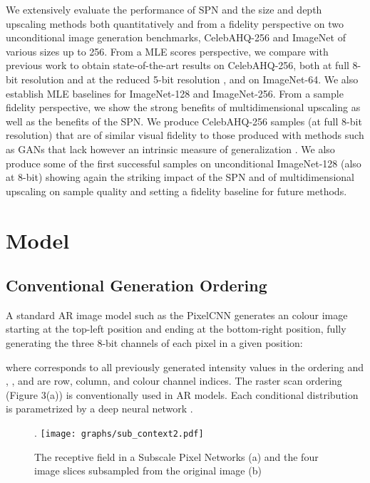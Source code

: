 \documentclass{article} \usepackage{iclr2019_conference,times}
\begin{document}
We extensively evaluate the performance of SPN and the size and depth upscaling methods both quantitatively and from a fidelity perspective on two unconditional image generation benchmarks, CelebAHQ-256 and ImageNet of various sizes up to 256. From a MLE scores perspective, we compare with previous work to obtain state-of-the-art results on CelebAHQ-256, both at full 8-bit resolution and at the reduced 5-bit resolution \citep{Glow}, and on ImageNet-64. We also establish MLE baselines for ImageNet-128 and ImageNet-256. From a sample fidelity perspective, we show the strong benefits of multidimensional upscaling as well as the benefits of the SPN. We produce CelebAHQ-256 samples (at full 8-bit resolution) that are of similar visual fidelity to those produced with methods such as GANs that lack however an intrinsic measure of generalization \citep{Mescheder,ProGAN}. We also produce some of the first successful samples on unconditional ImageNet-128 (also at 8-bit) showing again the striking impact of the SPN and of multidimensional upscaling on sample quality and setting a fidelity baseline for future methods.

\section{Model}

\subsection{Conventional Generation Ordering}

A standard AR image model such as the PixelCNN \citep{PixelRNN} generates an  colour image starting at the top-left position and ending at the bottom-right position, fully generating the three 8-bit channels of each pixel in a given position:


where  corresponds to all previously generated intensity values in the ordering and , , and  are row, column, and colour channel indices. The raster scan ordering (Figure 3(a)) is conventionally used in AR models. Each conditional distribution  is parametrized by a deep neural network \citep{PixelRNN}.

\begin{figure}
 \centering
. \texttt{[image: graphs/sub\_context2.pdf]}
 \vspace{-0.5cm}
 \caption{The receptive field in a Subscale Pixel Networks (a) and the four image slices subsampled from the original image (b)}
\end{figure}
\end{document}
